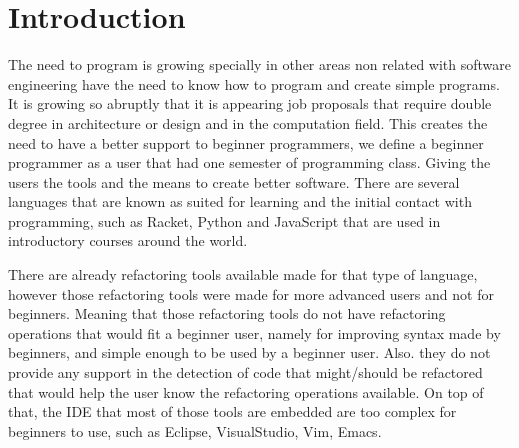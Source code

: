 \section{Introduction}



The need to program is growing specially in other areas non related with software engineering
have the need to know how to program and create simple programs. It is growing
so abruptly that it is appearing job proposals that require double degree in
architecture or design and in the computation field. %
This creates the need to have a better support to beginner programmers, we define
a beginner programmer as a user that had one semester of programming class.
Giving the users the tools and the means to create better software.
There are several languages that are known as suited for learning and the initial contact
with programming, such as Racket, Python and JavaScript that are used in introductory
courses around the world.

There are already refactoring tools available made for that type of language, %
however those refactoring tools were made for more advanced users and not for beginners.
Meaning that those refactoring tools do not have refactoring operations that would
fit a beginner user, namely for improving syntax made by beginners, and
simple enough to be used by a beginner user.
Also. they do not provide any support in the detection of code that might/should
be refactored that would help the user know the refactoring operations available.
On top of that, the IDE that most of those tools are embedded are too complex for beginners
to use, such as Eclipse, VisualStudio, Vim, Emacs. %


